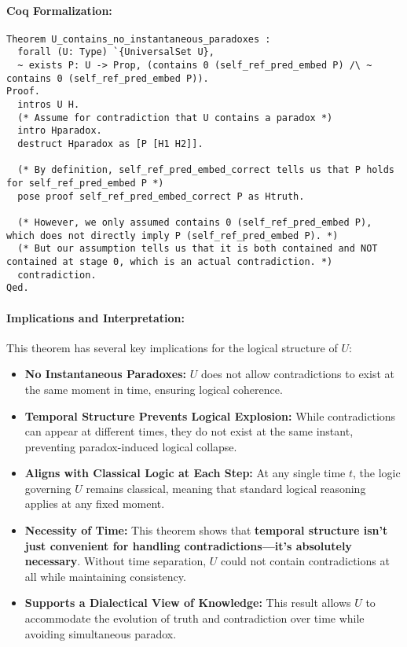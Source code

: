 \documentclass[12pt]{article}
\begin{document}
\paragraph{Coq Formalization:}
\begin{lstlisting}[language=Coq]
Theorem U_contains_no_instantaneous_paradoxes :
  forall (U: Type) `{UniversalSet U},
  ~ exists P: U -> Prop, (contains 0 (self_ref_pred_embed P) /\ ~ contains 0 (self_ref_pred_embed P)).
Proof.
  intros U H.
  (* Assume for contradiction that U contains a paradox *)
  intro Hparadox.
  destruct Hparadox as [P [H1 H2]].

  (* By definition, self_ref_pred_embed_correct tells us that P holds for self_ref_pred_embed P *)
  pose proof self_ref_pred_embed_correct P as Htruth.

  (* However, we only assumed contains 0 (self_ref_pred_embed P), which does not directly imply P (self_ref_pred_embed P). *)
  (* But our assumption tells us that it is both contained and NOT contained at stage 0, which is an actual contradiction. *)
  contradiction.
Qed.
\end{lstlisting}

\paragraph{Implications and Interpretation:}
This theorem has several key implications for the logical structure of \( U \):

\begin{itemize}
    \item \textbf{No Instantaneous Paradoxes:} \( U \) does not allow contradictions to exist at the same moment in time, ensuring logical coherence.
    \item \textbf{Temporal Structure Prevents Logical Explosion:} While contradictions can appear at different times, they do not exist at the same instant, preventing paradox-induced logical collapse.
    \item \textbf{Aligns with Classical Logic at Each Step:} At any single time \( t \), the logic governing \( U \) remains classical, meaning that standard logical reasoning applies at any fixed moment.
    \item \textbf{Necessity of Time:} This theorem shows that \textbf{temporal structure isn’t just convenient for handling contradictions—it’s absolutely necessary}. Without time separation, \( U \) could not contain contradictions at all while maintaining consistency.
    \item \textbf{Supports a Dialectical View of Knowledge:} This result allows \( U \) to accommodate the evolution of truth and contradiction over time while avoiding simultaneous paradox.
\end{itemize}
\end{document}
